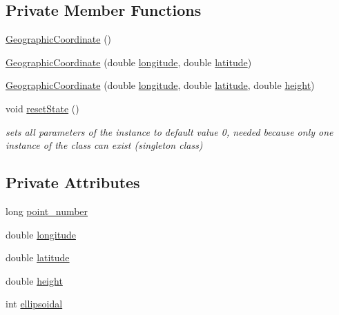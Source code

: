 \subsection*{Private Member Functions}
\begin{DoxyCompactItemize}
\item 
\hyperlink{classcoordinates_1_1_geographic_coordinate_a418ad8644fdc6d927a1eb8d57aeac922}{Geographic\+Coordinate} ()
\item 
\hyperlink{classcoordinates_1_1_geographic_coordinate_ae6e385071fe5663e16b344571b0131d0}{Geographic\+Coordinate} (double \hyperlink{classcoordinates_1_1_geographic_coordinate_a1ffbbfc5c01ab766af1d32bcc8cb42ad}{longitude}, double \hyperlink{classcoordinates_1_1_geographic_coordinate_a07a18abcc3cd691d4d8821a875dabbd6}{latitude})
\item 
\hyperlink{classcoordinates_1_1_geographic_coordinate_a41a98dc4f0a463d9b1584856da4ca9d0}{Geographic\+Coordinate} (double \hyperlink{classcoordinates_1_1_geographic_coordinate_a1ffbbfc5c01ab766af1d32bcc8cb42ad}{longitude}, double \hyperlink{classcoordinates_1_1_geographic_coordinate_a07a18abcc3cd691d4d8821a875dabbd6}{latitude}, double \hyperlink{classcoordinates_1_1_geographic_coordinate_a928334b65b117d99cd724d2c0b9b7ee0}{height})
\item 
void \hyperlink{classcoordinates_1_1_geographic_coordinate_ae489c187a21fc058b5af3d7d7ff1e5e7}{reset\+State} ()
\begin{DoxyCompactList}\small\item\em sets all parameters of the instance to default value 0, needed because only one instance of the class can exist (singleton class) \end{DoxyCompactList}\end{DoxyCompactItemize}
\subsection*{Private Attributes}
\begin{DoxyCompactItemize}
\item 
long \hyperlink{classcoordinates_1_1_geographic_coordinate_a7d7384b678b1b189a8a023653f9d3c19}{point\+\_\+number}
\item 
double \hyperlink{classcoordinates_1_1_geographic_coordinate_a1ffbbfc5c01ab766af1d32bcc8cb42ad}{longitude}
\item 
double \hyperlink{classcoordinates_1_1_geographic_coordinate_a07a18abcc3cd691d4d8821a875dabbd6}{latitude}
\item 
double \hyperlink{classcoordinates_1_1_geographic_coordinate_a928334b65b117d99cd724d2c0b9b7ee0}{height}
\item 
int \hyperlink{classcoordinates_1_1_geographic_coordinate_ab14ea3abf8e94174e4eff69ab983282e}{ellipsoidal}
\end{DoxyCompactItemize}
